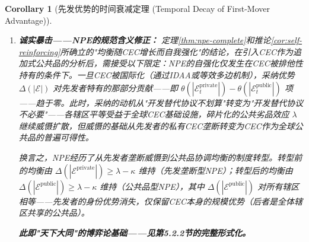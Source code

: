 \documentclass[12pt,a4paper]{ctexart}
\newtheorem{corollary}[theorem]{Corollary}
\theoremstyle{definition}
\theoremstyle{remark}
\begin{document}
\begin{corollary}[先发优势的时间衰减定理 (Temporal Decay of First-Mover Advantage)]
\begin{enumerate}[label=(\roman*), itemsep=6pt]
\item \textbf{诚实暴击——NPE的规范含义修正：} 定理\ref{thm:npe-complete}和推论\ref{cor:self-reinforcing}所确立的"均衡随CEC增长而自我强化"的结论，在引入CEC作为追加式公共品的分析后，需接受以下限定：NPE的自强化仅发生在CEC被\textit{排他性持有}的条件下。一旦CEC被国际化（通过IDAA或等效多边机制），采纳优势 $\Delta(|\mathcal{E}|)$ 对先发者特有的那部分贡献——即 $\theta(|\mathcal{E}_t^{\text{private}}|) - \theta(|\mathcal{E}_t^{\text{public}}|)$ 项——趋于零。此时，采纳的动机从"开发替代协议不划算"转变为"开发替代协议不必要"——各辖区平等受益于全球CEC基础设施，碎片化的公共劣品效应 $\lambda$ 继续威慑扩散，但威慑的基础从先发者的私有CEC垄断转变为CEC作为全球公共品的普遍可得性。

换言之，NPE经历了从\textit{先发者垄断威慑}到\textit{公共品协调均衡}的制度转型。转型前的均衡由 $\Delta(|\mathcal{E}^{\text{private}}|) \geq \lambda - \kappa$ 维持（先发垄断型NPE）；转型后的均衡由 $\Delta(|\mathcal{E}^{\text{public}}|) \geq \lambda - \kappa$ 维持（公共品型NPE），其中 $\Delta(|\mathcal{E}^{\text{public}}|)$ 对所有辖区相等——先发者的身份优势消失，仅保留CEC本身的规模优势（后者是全体辖区共享的公共品）。

\textbf{此即"天下大同"的博弈论基础——见第5.2.2节的完整形式化。}
\end{enumerate}
\end{corollary}
\end{document}
